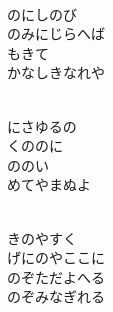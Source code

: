 \documentclass[10pt,b5j]{tarticle} %
\begin{document}
\begin{enumerate}
\begin{minipage}[c]{\blocksize}
    \end{minipage}
    \begin{minipage}[c]{\blocksize}
        
        \vspace{\linespace}
        \item~\\
        のにしのび\\
        のみにじらへば\\
        もきて\\
        かなしきなれや
        
    \end{minipage}
    \begin{minipage}[c]{\blocksize}
        
        \vspace{\linespace}
        \item~\\
        にさゆるの\\
        くののに\\
        ののい\\
        めてやまぬよ
        
    \end{minipage}
    \begin{minipage}[c]{\blocksize}
        
        \vspace{\linespace}
        \item~\\
        きのやすく\\
        げにのやここに\\
        のぞただよへる\\
        のぞみなぎれる
    
    \end{minipage}
\end{enumerate} %
\end{document}
